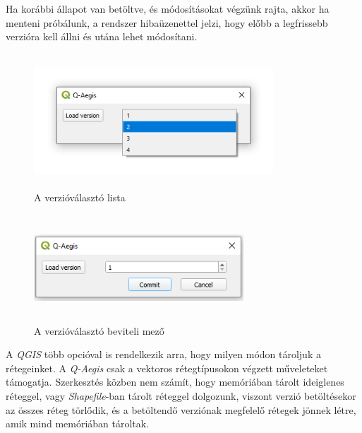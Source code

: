 Ha korábbi állapot van betöltve, és módosításokat végzünk rajta, akkor ha menteni próbálunk, a rendszer hibaüzenettel jelzi, hogy előbb a legfrissebb verzióra kell állni és utána lehet módosítani.
\begin{figure}[H]
	\centering
	\includegraphics[width=0.8\textwidth,height=190px]{images/version_combobox.png}
	\caption{A verzióválasztó lista}
	\label{fig:picture-4}
\end{figure}
\begin{figure}[H]
	\centering
	\includegraphics[width=0.7\textwidth,height=150px]{images/version_spinner.png}
	\caption{A verzióválasztó beviteli mező}
	\label{fig:picture-5}
\end{figure}

\begin{note}
A \emph{QGIS} több opcióval is rendelkezik arra, hogy milyen módon tároljuk a rétegeinket. A \emph{Q-Aegis} csak a vektoros rétegtípusokon végzett műveleteket támogatja. Szerkesztés közben nem számít, hogy memóriában tárolt ideiglenes réteggel, vagy \emph{Shapefile}-ban tárolt réteggel dolgozunk, viszont verzió betöltésekor az összes réteg törlődik, és a betöltendő verziónak megfelelő rétegek jönnek létre, amik mind memóriában tároltak.
\end{note}

